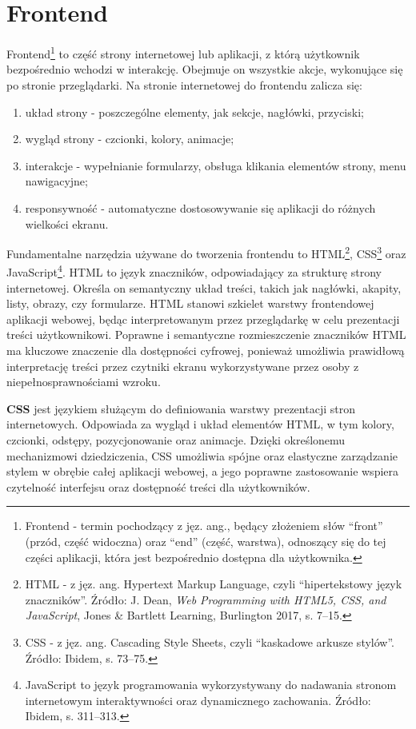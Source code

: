 \documentclass[12pt,a4paper,twoside]{report}
\newcommand{\FirstParagraph}{\noindent\ignorespaces}
\begin{document}
\chapter{Frontend}

\FirstParagraph Frontend\footnote{Frontend - termin pochodzący z jęz. ang., będący złożeniem słów ``front'' (przód, część widoczna) oraz ``end'' (część, warstwa), odnoszący się do tej części aplikacji, która jest bezpośrednio dostępna dla użytkownika.} to część strony internetowej lub aplikacji, z którą użytkownik bezpośrednio wchodzi w interakcję. Obejmuje on wszystkie akcje, wykonujące się po stronie przeglądarki. Na stronie internetowej do frontendu zalicza się:

\begin{enumerate}
\def\labelenumi{\arabic{enumi}.}
\item
  układ strony - poszczególne elementy, jak sekcje, nagłówki, przyciski;
\item
  wygląd strony - czcionki, kolory, animacje;
\item
  interakcje - wypełnianie formularzy, obsługa klikania elementów strony, menu nawigacyjne;
\item
  responsywność - automatyczne dostosowywanie się aplikacji do różnych wielkości ekranu.
\end{enumerate}

Fundamentalne narzędzia używane do tworzenia frontendu to HTML\footnote{HTML - z jęz. ang. Hypertext Markup Language, czyli ``hipertekstowy język znaczników''. Źródło: J. Dean, \emph{Web Programming with HTML5, CSS, and JavaScript}, Jones \& Bartlett Learning, Burlington 2017, s. 7--15.}, CSS\footnote{CSS - z jęz. ang. Cascading Style Sheets, czyli ``kaskadowe arkusze stylów''. Źródło: Ibidem, s. 73--75.} oraz JavaScript\footnote{JavaScript to język programowania wykorzystywany do nadawania stronom internetowym interaktywności oraz dynamicznego zachowania. Źródło: Ibidem, s. 311--313.}. HTML to język znaczników, odpowiadający za strukturę strony internetowej. Określa on semantyczny układ treści, takich jak nagłówki, akapity, listy, obrazy, czy formularze. HTML stanowi szkielet warstwy frontendowej aplikacji webowej, będąc interpretowanym przez przeglądarkę w celu prezentacji treści użytkownikowi. Poprawne i semantyczne rozmieszczenie znaczników HTML ma kluczowe znaczenie dla dostępności cyfrowej, ponieważ umożliwia prawidłową interpretację treści przez czytniki ekranu wykorzystywane przez osoby z niepełnosprawnościami wzroku.

\textbf{CSS} jest językiem służącym do definiowania warstwy prezentacji stron internetowych. Odpowiada za wygląd i układ elementów HTML, w tym kolory, czcionki, odstępy, pozycjonowanie oraz animacje. Dzięki określonemu mechanizmowi dziedziczenia, CSS umożliwia spójne oraz elastyczne zarządzanie stylem w obrębie całej aplikacji webowej, a jego poprawne zastosowanie wspiera czytelność interfejsu oraz dostępność treści dla użytkowników.
\end{document}
